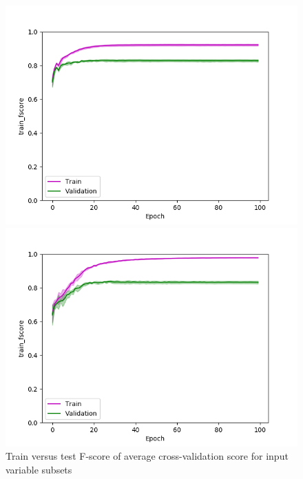 \def\year{2017}\relax \documentclass[letterpaper]{article}
\begin{document}
\begin{figure}
\begin{minipage}{.24\textwidth}
  \centering
\includegraphics[width=\textwidth]{pics/d3_train_fscore_mean_train_test.png}
\caption{$D_3$}\label{fig:d3fscoretraintest}
\end{minipage}
\begin{minipage}{.01\textwidth}
\end{minipage}
\begin{minipage}{.24\textwidth}
  \centering
\includegraphics[width=\textwidth]{pics/d4_train_fscore_mean_train_test.png}
\caption{$D_4$}\label{fig:d4fscoretraintest}
\end{minipage}
\caption{Train versus test F-score of average cross-validation score for input variable subsets}\label{fig:traintestfscore}
\end{figure}
\end{document}
